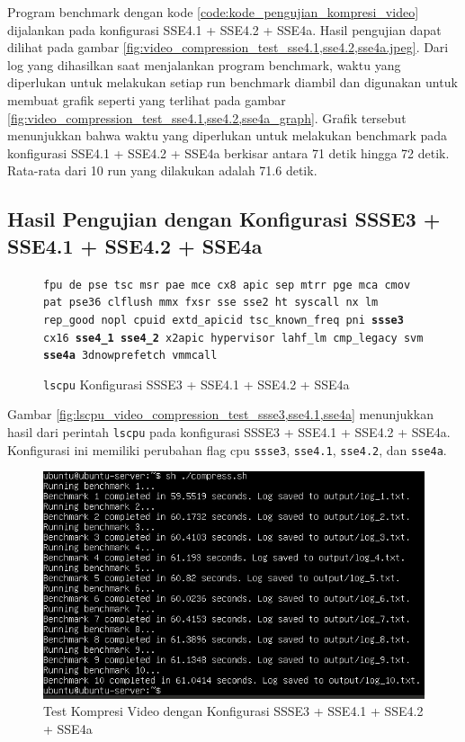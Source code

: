 Program benchmark dengan kode \ref{code:kode_pengujian_kompresi_video} dijalankan pada konfigurasi SSE4.1 + SSE4.2 + SSE4a. Hasil pengujian dapat dilihat pada gambar \ref{fig:video_compression_test_sse4.1,sse4.2,sse4a.jpeg}. Dari log yang dihasilkan saat menjalankan program benchmark, waktu yang diperlukan untuk melakukan setiap run benchmark diambil dan digunakan untuk membuat grafik seperti yang terlihat pada gambar \ref{fig:video_compression_test_sse4.1,sse4.2,sse4a_graph}. Grafik tersebut menunjukkan bahwa waktu yang diperlukan untuk melakukan benchmark pada konfigurasi SSE4.1 + SSE4.2 + SSE4a berkisar antara 71 detik hingga 72 detik. Rata-rata dari 10 run yang dilakukan adalah 71.6 detik.

\subsection{Hasil Pengujian dengan Konfigurasi SSSE3 + SSE4.1 + SSE4.2 + SSE4a}
\begin{figure}
    \texttt{fpu de pse tsc msr pae mce cx8 apic sep mtrr pge mca cmov pat pse36 clflush mmx fxsr sse sse2 ht syscall nx lm rep\_good nopl cpuid extd\_apicid tsc\_known\_freq pni \textbf{ssse3} cx16 \textbf{sse4\_1} \textbf{sse4\_2} x2apic hypervisor lahf\_lm cmp\_legacy svm \textbf{sse4a} 3dnowprefetch vmmcall}
    \caption{\texttt{lscpu} Konfigurasi SSSE3 + SSE4.1 + SSE4.2 + SSE4a}
    \label{fig:lscpu_video_compression_test_ssse3,sse4.1,sse4.2,sse4a.jpeg}
\end{figure}

Gambar \ref{fig:lscpu_video_compression_test_ssse3,sse4.1,sse4a} menunjukkan hasil dari perintah \texttt{lscpu} pada konfigurasi SSSE3 + SSE4.1 + SSE4.2 + SSE4a. Konfigurasi ini memiliki perubahan flag cpu \texttt{ssse3}, \texttt{sse4.1}, \texttt{sse4.2}, dan \texttt{sse4a}.

\begin{figure}
    \centering
    \includegraphics[width=1\textwidth]
    {assets/pics/video-compression-test/ssse3,sse4.1,sse4.2,sse4a.jpeg}
    \caption{Test Kompresi Video dengan Konfigurasi SSSE3 + SSE4.1 + SSE4.2 + SSE4a}
    \label{fig:video_compression_test_ssse3,sse4.1,sse4.2,sse4a.jpeg}
\end{figure}


